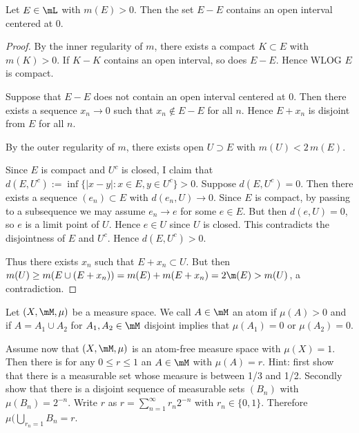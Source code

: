 \documentclass{article}
\begin{document}
 Let $E \in \mL$ with $m(E) > 0$. Then the set $E - E$ contains an open interval centered at 0.
\begin{proof}
By the inner regularity of $m$, there exists a compact $K \subset E$ with $m(K) > 0$. If $K - K$ contains an open interval, so does $E - E$. Hence WLOG $E$ is compact.

Suppose that $E - E$ does not contain an open interval centered at 0. Then there exists a sequence $x_n \to 0$ such that $x_n \not\in E - E$ for all $n$.  Hence $E + x_n$ is disjoint from $E$ for all $n$.

By the outer regularity of $m$, there exists open $U \supset E$ with $m(U) < 2 \,m(E)$.  

Since $E$ is compact and $U^c$ is closed,  I claim that $d(E, U^c) := \inf\{|x - y| : x \in E, y \in U^c\} > 0$. Suppose $d(E, U^c) = 0$. Then there exists a sequence $(e_n) \subset E$ with $d(e_n, U) \to 0$.  Since $E$ is compact, by passing to a subsequence we may assume $e_n \to e$ for some $e \in E$.  But then $d(e, U) = 0$, so $e$ is a limit point of $U$.  Hence $e \in U$ since $U$ is closed. This contradicts the disjointness of $E$ and $U^c$. Hence $d(E, U^c) > 0$.

Thus there exists $x_n$ such that $E + x_n \subset U$.  But then $m(U) \ge m(E \cup (E + x_n)) = m(E) + m(E + x_n) = 2 \m(E) > m(U)$, a contradiction.
\end{proof}

 Let $(X , \mM, \mu)$ be a measure space. We call $A \in \mM$ an atom if $\mu(A) > 0$ and if $A = A_1 \cup A_2$ for $A_1, A_2 \in \mM$ disjoint implies that $\mu(A_1) = 0$ or $\mu(A_2) = 0$.

Assume now that $(X, \mM, \mu)$ is an atom-free measure space with $\mu(X) = 1$. Then there is for any $0 \le r \le 1$ an $A \in \mM$ with $\mu(A) = r$. Hint: first show that there is a measurable set whose measure is between 1/3 and 1/2. Secondly show that there is a disjoint sequence of measurable sets $(B_n)$ with $\mu(B_n) = 2^{-n}$. Write $r$ as $r = \sum_{n=1}^\infty r_n2^{-n}$ with $r_n \in \{0, 1\}$.  Therefore $\mu(\bigcup_{r_n=1} B_n = r$.
\end{document}
